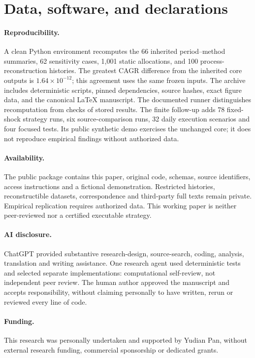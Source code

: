 \documentclass[12pt,letterpaper]{article}
\begin{document}


\FloatBarrier
\section{Data, software, and declarations}
\paragraph{Reproducibility.} A clean Python environment recomputes the 66 inherited period--method summaries, 62 sensitivity cases, 1,001 static allocations, and 100 process-reconstruction histories. The greatest CAGR difference from the inherited core outputs is $1.64\times10^{-12}$; this agreement uses the same frozen inputs. The archive includes deterministic scripts, pinned dependencies, source hashes, exact figure data, and the canonical LaTeX manuscript. The documented runner distinguishes recomputation from checks of stored results. The finite follow-up adds 78 fixed-shock strategy runs, six source-comparison runs, 32 daily execution scenarios and four focused tests. Its public synthetic demo exercises the unchanged core; it does not reproduce empirical findings without authorized data.

\paragraph{Availability.} The public package contains this paper, original code, schemas, source identifiers, access instructions and a fictional demonstration. Restricted histories, reconstructible datasets, correspondence and third-party full texts remain private. Empirical replication requires authorized data. This working paper is neither peer-reviewed nor a certified executable strategy.

\paragraph{AI disclosure.} ChatGPT provided substantive research-design, source-search, coding, analysis, translation and writing assistance. One research agent used deterministic tests and selected separate implementations: computational self-review, not independent peer review. The human author approved the manuscript and accepts responsibility, without claiming personally to have written, rerun or reviewed every line of code.

\ifdefined\AnonymousMode\else
\paragraph{Funding.} This research was personally undertaken and supported by Yudian Pan, without external research funding, commercial sponsorship or dedicated grants.
\end{document}
